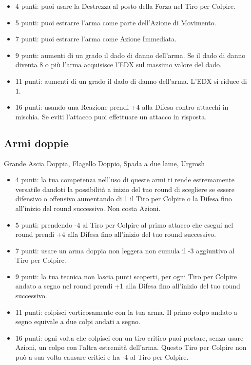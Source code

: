 \begin{multicols}{2}
\begin{itemize}[leftmargin=*]
\item 4 punti: puoi usare la Destrezza al posto della Forza nel Tiro per Colpire.
\item 5 punti: puoi estrarre l'arma come parte dell'Azione di Movimento.
\item 7 punti: puoi estrarre l'arma come Azione Immediata.
\item 9 punti: aumenti di un grado il dado di danno dell'arma. Se il dado di danno diventa 8 o più l'arma acquisisce l'EDX sul massimo valore del dado.
\item 11 punti: aumenti di un grado il dado di danno dell'arma. L'EDX si riduce di 1.
\item 16 punti: usando una Reazione prendi +4 alla Difesa contro attacchi in mischia. Se eviti l'attacco puoi effettuare un attacco in risposta.

\end{itemize}

\subsection{Armi doppie}  Grande Ascia Doppia, Flagello Doppio, Spada a due lame, Urgrosh\label{listaarmidoppie}

\begin{itemize}[leftmargin=*] \setlength{\itemsep}{0pt}
\item 4 punti: la tua competenza nell'uso di queste armi ti rende estremamente versatile dandoti la possibilità a inizio del tuo round di scegliere se essere difensivo o offensivo aumentando di 1 il Tiro per Colpire o la Difesa fino all'inizio del round successivo. Non costa Azioni.
\item 5 punti: prendendo -4 al Tiro per Colpire al primo attacco che esegui nel round prendi +4 alla Difesa fino all'inizio del tuo round successivo.
\item 7 punti: usare un arma doppia non leggera non cumula il -3 aggiuntivo al Tiro per Colpire.
\item 9 punti: la tua tecnica non lascia punti scoperti, per ogni Tiro per Colpire andato a segno nel round prendi +1 alla Difesa fino all'inizio del tuo round successivo.
\item 11 punti: colpisci vorticosamente con la tua arma. Il primo colpo andato a segno equivale a due colpi andati a segno.
\item 16 punti: ogni volta che colpisci con un tiro critico puoi portare, senza usare Azioni, un colpo con l'altra estremità dell'arma. Questo Tiro per Colpire non può a sua volta causare critici e ha -4 al Tiro per Colpire.


\end{itemize}
\end{multicols}
